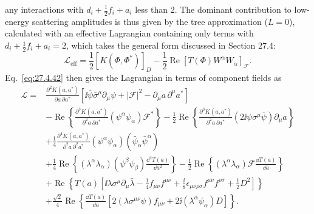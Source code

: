 any interactions with \(d_i+\tfrac12f_i+a_i\) less than 2. The dominant
contribution to low-energy scattering amplitudes is thus given by the tree
approximation (\(L=0\)), calculated with an effective Lagrangian containing
only terms with \(d_i+\tfrac12f_i+a_i=2\), which takes the general form
discussed in Section 27.4:
\begin{equation}
  \mathcal{L}_{\mathrm{eff}}
  =\frac12\left[K(\Phi,\Phi^*)\right]_D
  -\frac12\operatorname{Re}
    \left[T(\Phi)W^\alpha W_\alpha\right]_{\mathcal F}.
  \tag{29.5.13}\label{eq:29.5.13}
\end{equation}
Eq.~\eqref{eq:27.4.42} then gives the Lagrangian in terms of component
fields as
\begin{equation}
  \begin{aligned}
  \mathcal{L}
  ={}&
  \frac{\partial^2K(a,a^*)}{\partial a\,\partial a^*}
  \left[
    \ii\bar\psi\bar\sigma^\mu\partial_\mu\psi
    +\lvert\mathcal{F}\rvert^2
    -\partial_\mu a\,\partial^\mu a^*
  \right]
  \\
  &-\operatorname{Re}\left\{
    \frac{\partial^3K(a,a^*)}{\partial^2a\,\partial a^*}
    \left(\psi^\alpha\psi_\alpha\right)\mathcal{F}^*
  \right\}
  -\frac12\operatorname{Re}\left\{
    \frac{\partial^3K(a,a^*)}{\partial^2a\,\partial a^*}
    \left(2\ii\psi\sigma^\mu\bar\psi\right)\partial_\mu a
  \right\}
  \\
  &+\frac14
    \frac{\partial^4K(a,a^*)}{\partial^2a\,\partial^2a^*}
    \left(\psi^\alpha\psi_\alpha\right)
    \left(\bar\psi_{\dot\alpha}\bar\psi^{\dot\alpha}\right)
  \\
  &+\frac14\operatorname{Re}\left\{
    \left(\lambda^\alpha\lambda_\alpha\right)
    \left(\psi^\beta\psi_\beta\right)\frac{\dd^2T(a)}{\dd a^2}
  \right\}
  -\frac12\operatorname{Re}\left\{
    \left(\lambda^\alpha\lambda_\alpha\right)
    \mathcal{F}\frac{\dd T(a)}{\dd a}
  \right\}
  \\
  &+\operatorname{Re}\left\{
    T(a)\left[
      \ii\lambda\sigma^\mu\partial_\mu\bar\lambda
      -\frac14f_{\mu\nu}f^{\mu\nu}
      +\frac{\ii}{8}\epsilon_{\mu\nu\rho\sigma}
        f^{\mu\nu}f^{\rho\sigma}
      +\frac12D^2
    \right]
  \right\}
  \\
  &+\frac{\sqrt{2}}{4}\operatorname{Re}\left\{
    \frac{\dd T(a)}{\dd a}\left[
      2\left(\lambda\sigma^{\mu\nu}\psi\right)f_{\mu\nu}
      +2\ii\left(\lambda^\alpha\psi_\alpha\right)D
    \right]
  \right\}.
  \end{aligned}
  \tag{29.5.14}\label{eq:29.5.14}
\end{equation}
